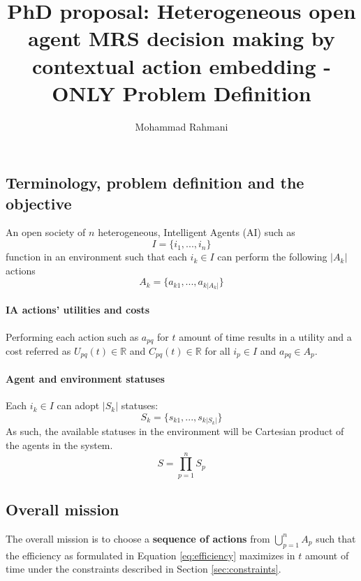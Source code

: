 \documentclass{article}
\begin{document}
	
	\title{PhD proposal: Heterogeneous open agent MRS decision making by contextual action embedding - ONLY Problem Definition}
	\author{Mohammad Rahmani}
	\date{}
	\maketitle
	\begin{multicols}{2}
	
	
	\section{Terminology, problem definition and the objective} \label{sec:problem-definition}
		An open society of $n$ heterogeneous, Intelligent Agents (AI) such as 
		\begin{equation}
			I = \{i_1,..., i_n\}
			\label{eq:agents-list}
		\end{equation}
		function in an environment such that each $i_k \in I$ can perform the following $|A_k|$ actions
		\begin{equation}
			A_k = \{a_{k1},...,a_{k|A_k|}\}
			\label{eq:agents-actions-list}
		\end{equation}
		
		\paragraph{IA actions' utilities and costs} Performing each action such as $a_{pq}$ for $t$ amount of time results in a utility and a cost referred as $U_{pq}(t) \in \mathbb{R}$ and $C_{pq}(t)  \in \mathbb{R}$ for all $i_p \in I$ and $a_{pq} \in A_p$. 
		
		\paragraph{Agent and environment statuses} Each $i_k \in I$ can adopt $|S_k|$ statuses:  
			\begin{equation}
				S_k = \{s_{k1},...,s_{k|S_k|}\}
				\label{eq:agents-status-list}
			\end{equation}
			As such, the available statuses in the environment will be Cartesian product of the agents in the system. 
			\begin{equation}
				S = \prod\limits_{p=1}^{n} S_p
				\label{eq:environment-statuses}
			\end{equation}
		
		\subsection{Overall mission}\label{sec:problem}
			The overall mission is to choose a \textbf{sequence of actions} from $\bigcup\limits_{p=1}^{n}A_p$ such that the efficiency as formulated in Equation \ref{eq:efficiency} maximizes in $t$ amount of time under the constraints described in Section \ref{sec:constraints}.

\end{multicols}
\end{document}
